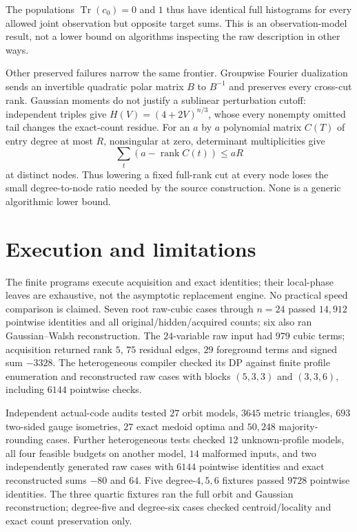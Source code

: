 \documentclass[11pt,a4paper]{article}
\newcommand{\rank}{\operatorname{rank}}\newcommand{\poly}{\operatorname{poly}}
\begin{document}
The populations $\operatorname{Tr}(c_0)=0$ and $1$ thus have
identical full histograms for every allowed joint observation
but opposite target sums. This is an observation-model result,
not a lower bound on algorithms inspecting the raw description
in other ways.

Other preserved failures narrow the same frontier.
Groupwise Fourier dualization sends an invertible quadratic
polar matrix $B$ to $B^{-1}$ and preserves every cross-cut rank.
Gaussian moments do not justify a sublinear perturbation cutoff:
independent triples give $H(V)=(4+2V)^{n/3}$, whose every
nonempty omitted tail changes the exact-count residue.
For an $a$ by $a$ polynomial matrix $C(T)$ of entry degree
at most $R$, nonsingular at zero, determinant multiplicities give
\[
\sum_t(a-\rank C(t))\le aR
\]
at distinct nodes. Thus lowering a fixed full-rank cut at
every node loses the small degree-to-node ratio needed by
the source construction. None is a generic algorithmic lower bound.

\section{Execution and limitations}
The finite programs execute acquisition and exact identities;
their local-phase leaves are exhaustive, not the asymptotic
replacement engine. No practical speed comparison is claimed.
Seven root raw-cubic cases through $n=24$ passed $14{,}912$
pointwise identities and all original/hidden/acquired counts;
six also ran Gaussian--Walsh reconstruction. The $24$-variable
raw input had $979$ cubic terms; acquisition returned rank $5$,
$75$ residual edges, $29$ foreground terms and signed sum $-3328$.
The heterogeneous compiler checked its DP against finite profile
enumeration and reconstructed raw cases with blocks $(5,3,3)$
and $(3,3,6)$, including $6144$ pointwise checks.

Independent actual-code audits tested $27$ orbit models, $3645$
metric triangles, $693$ two-sided gauge isometries, $27$ exact
medoid optima and $50{,}248$ majority-rounding cases.
Further heterogeneous tests checked $12$ unknown-profile models,
all four feasible budgets on another model, $14$ malformed inputs,
and two independently generated raw cases with $6144$ pointwise
identities and exact reconstructed sums $-80$ and $64$.
Five degree-$4,5,6$ fixtures passed $9728$ pointwise identities.
The three quartic fixtures ran the full orbit and Gaussian
reconstruction; degree-five and degree-six cases checked
centroid/locality and exact count preservation only.
\end{document}
